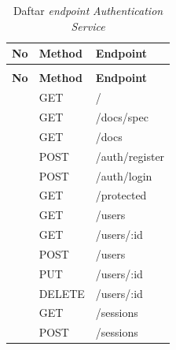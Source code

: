 \begin{xltabular}{\textwidth}{ | >{\raggedright\arraybackslash}p{1cm} | >{\raggedright\arraybackslash}p{2.2cm} | >{\raggedright\arraybackslash}X | }
  \caption{Daftar \textit{endpoint} \textit{Authentication Service}} \label{tab:endpoint-auth} \\
  \hline
  \textbf{No} & \textbf{Method} & \textbf{Endpoint} \\
  \hline
  \endfirsthead
   \\
  \hline
  \textbf{No} & \textbf{Method} & \textbf{Endpoint} \\
  \hline
  \endhead
  \hline
   & GET & / \\
     & GET & /docs/spec \\
     & GET & /docs \\
     & POST & /auth/register \\
     & POST & /auth/login \\
     & GET & /protected \\
     & GET & /users \\
     & GET & /users/:id \\
     & POST & /users \\
     & PUT & /users/:id \\
     & DELETE & /users/:id \\
     & GET & /sessions \\
     & POST & /sessions \\
    \hline

\end{xltabular}

